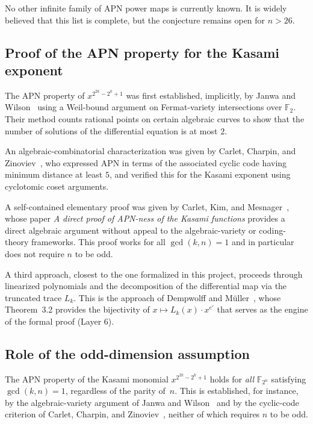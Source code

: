 \documentclass[11pt]{article}
\begin{document}
No other infinite family of APN power maps is currently known. It is widely believed that
this list is complete, but the conjecture remains open for $n>26$.

\subsection{Proof of the APN property for the Kasami exponent}
The APN property of $x^{2^{2k}-2^k+1}$ was first established, implicitly, by Janwa and
Wilson~\cite{JanwaWilson1993} using a Weil-bound argument on Fermat-variety intersections
over $\mathbb{F}_2$. Their method counts rational points on certain algebraic curves to
show that the number of solutions of the differential equation is at most $2$.

An algebraic-combinatorial characterization was given by Carlet, Charpin, and
Zinoviev~\cite{CarletCharpinZinoviev1998}, who expressed APN in terms of the associated
cyclic code having minimum distance at least $5$, and verified this for the Kasami exponent
using cyclotomic coset arguments.

A self-contained elementary proof was given by Carlet, Kim, and
Mesnager~\cite{CarletKimMesnager}, whose paper \textit{A direct proof of APN-ness
of the Kasami functions} provides a direct algebraic argument without appeal to the
algebraic-variety or coding-theory frameworks. This proof works for all $\gcd(k,n)=1$
and in particular does not require $n$ to be odd.

A third approach, closest to the one formalized in this project, proceeds through linearized
polynomials and the decomposition of the differential map via the truncated trace $L_k$.
This is the approach of Dempwolff and M\"{u}ller~\cite{DempwolffMueller2021}, whose
Theorem~3.2 provides the bijectivity of $x\mapsto L_k(x)\cdot x^{e'}$ that serves as the
engine of the formal proof (Layer 6).

\subsection{Role of the odd-dimension assumption}
The APN property of the Kasami monomial $x^{2^{2k}-2^k+1}$ holds for \emph{all}
$\mathbb{F}_{2^n}$ satisfying $\gcd(k,n)=1$, regardless of the parity of~$n$. This is
established, for instance, by the algebraic-variety argument of Janwa and
Wilson~\cite{JanwaWilson1993} and by the cyclic-code criterion of Carlet, Charpin, and
Zinoviev~\cite{CarletCharpinZinoviev1998}, neither of which requires $n$ to be odd.
\end{document}
